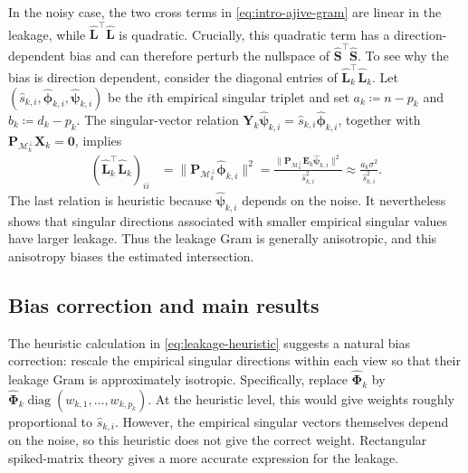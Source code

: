 \documentclass[11pt]{article}
\newcommand{\trans}{\top}
\DeclareMathOperator{\diag}{diag}
\newcommand{\cM}{\mathcal{M}}
\begin{document}
In the noisy case, the two cross terms in
\cref{eq:intro-ajive-gram} are linear in the leakage, while
$\widehat{\bm L}^\trans\widehat{\bm L}$ is quadratic. Crucially, this
quadratic term has a direction-dependent bias and can therefore perturb the
nullspace of $\widehat{\bm S}^\trans\widehat{\bm S}$. 
To see why the bias is
direction dependent, consider the diagonal entries of 
$\widehat{\bm L}_k^\trans\widehat{\bm L}_k$. Let
$(\widehat s_{k,i},\widehat{\bm\phi}_{k,i},
\widehat{\bm\psi}_{k,i})$
be the $i$th empirical singular triplet and set
$a_k\coloneqq n-p_k$ and $b_k\coloneqq d_k-p_k$. The singular-vector relation
$\bm Y_k\widehat{\bm\psi}_{k,i}
=
\widehat s_{k,i}\widehat{\bm\phi}_{k,i}$,
together with
$\bm P_{\cM_k^\perp}\bm X_k=\bm 0$,
implies
\begin{equation}
\label{eq:leakage-heuristic}
\begin{aligned}
  (\widehat{\bm L}_k^\trans\widehat{\bm L}_k)_{ii}
  &=
  \bigl\|
    \bm P_{\cM_k^\perp}\widehat{\bm\phi}_{k,i}
  \bigr\|^2
  =
  \frac{
    \bigl\|
      \bm P_{\cM_k^\perp}
      \bm E_k\widehat{\bm\psi}_{k,i}
    \bigr\|^2
  }{
    \widehat s_{k,i}^2
  }
  \approx
  \frac{a_k\sigma^2}{\widehat s_{k,i}^2}.
\end{aligned}
\end{equation}
The last relation is heuristic because
$\widehat{\bm\psi}_{k,i}$ depends on the noise.  It
nevertheless shows that singular
directions associated with smaller empirical singular values have larger
leakage. 
Thus the leakage Gram is generally anisotropic, and this anisotropy biases the estimated intersection.




\subsection{Bias correction and main results}
\label{sec:intro-leakage-correction}

The heuristic calculation in \cref{eq:leakage-heuristic} suggests a natural
bias correction: rescale the empirical singular directions within each view
so that their leakage Gram is approximately isotropic. Specifically, replace
$\widehat{\bm\Phi}_k$ by
$\widehat{\bm\Phi}_k\diag(w_{k,1},\ldots,w_{k,p_k})$. 
At the heuristic level, this would give weights roughly proportional to
$\widehat s_{k,i}$. However, the empirical singular vectors themselves depend on the noise, so
this heuristic does not give the correct weight. Rectangular spiked-matrix
theory gives a more accurate expression for the leakage.
\end{document}
